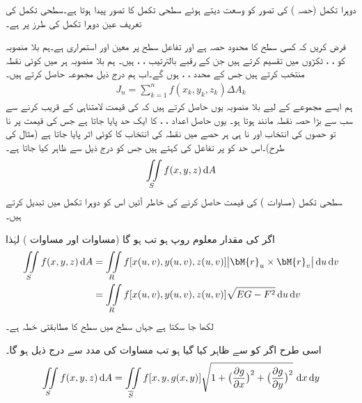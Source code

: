 دوہرا تکمل (حصہ ) کی تصور کو وسعت دیتے ہوئے سطحی تکمل کا تصور پیدا ہوتا ہے۔سطحی تکمل کی تعریف عین دوہرا تکمل کی طرز پر ہے۔

فرض کریں کہ  کسی سطح کا محدود حصہ ہے اور تفاعل  سطح  پر معین اور استمراری ہے۔ہم بلا منصوبہ  کو ، ،  ٹکڑوں میں تقسیم کرتے ہیں جن کے  رقبے بالترتیب  ، ،  ہیں۔ ہم بلا منصوبہ ہر  میں کوئی نقطہ   منتخب کرتے ہیں جس کے محدد ، ،  ہوں گے۔اب ہم درج ذیل مجموعہ حاصل کرتے ہیں۔
\begin{align}\label{مساوات_خطی_تکمل_سطحی_تکمل_الف}
J_n=\sum_{k=1}^{n}f(x_k,y_k,z_k)\Delta A_k
\end{align}
ہم ایسے مجموعے  کے لیے بلا منصوبہ یوں حاصل کرتے ہیں کہ  کی قیمت لامتناہی کے قریب کرنے سے سب سے بڑا حصہ  نقطہ مانند ہوتا ہو۔ یوں حاصل اعداد ، ،  کا ایک حد پایا جاتا ہے جس کی قیمت پر نا تو حصوں کی انتخاب اور نا ہی ہر حصے میں نقطہ کی انتخاب کا کوئی اثر پایا جاتا ہے (مثال  کی طرح)۔اس حد کو  پر تفاعل  کی  کہتے ہیں جس کو درج ذیل سے ظاہر کیا جاتا ہے۔
\begin{align}\label{مساوات_خطی_تکمل_سطحی_تکمل_ب}
\iint\limits_S f(x,y,z)\dif A
\end{align}
سطحی تکمل (مساوات ) کی قیمت حاصل کرنے کی خاطر آئیں اس کو دوہرا تکمل میں تبدیل کرتے ہیں۔

اگر  کی مقدار معلوم روپ  ہو تب  ہو گا (مساوات  اور مساوات ) لہٰذا
\begin{gather}
\begin{aligned}\label{مساوات_خطی_تکمل_سطحی_تکمل_بطور_دوہرا_الف}
\iint\limits_S f(x,y,z)\dif A&=\iint\limits_R f[x(u,v),y(u,v),z(u,v)] \abs{\bM{r}_u\times \bM{r}_v}\dif u\dif v\\
&=\iint\limits_R f[x(u,v),y(u,v),z(u,v)] \sqrt{EG-F^2}\dif u\dif v 
\end{aligned}
\end{gather}
لکھا جا سکتا ہے جہاں  سطح میں  سطح  کا مطابقتی خطہ ہے۔ 

اسی طرح اگر  کو  سے ظاہر کیا گیا ہو تب مساوات  کی مدد سے درج ذیل ہو گا۔
\begin{align}\label{مساوات_خطی_تکمل_سطحی_تکمل_بطور_دوہرا_ب}
\iint\limits_S f(x,y,z)\dif A=\iint\limits_{\overline{S}} f[x,y,g(x,y)]\sqrt{1+\big(\frac{\partial g}{\partial x}\big)^2+\big(\frac{\partial g}{\partial y}\big)^2}\,\dif x\dif y
\end{align}

